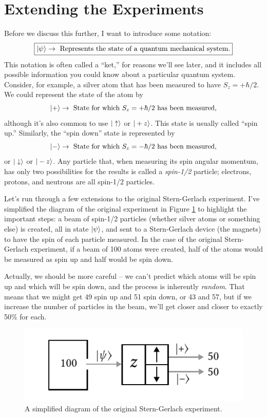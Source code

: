 %
%
%

\section{Extending the Experiments}

Before we discuss this further, I want to introduce some notation:
\begin{equation}
\label{eq_ket_definition}
\boxed{
| \psi \rangle \rightarrow \text{ Represents the state of a quantum mechanical system.}
}
\end{equation}
This notation is often called a ``ket,'' for reasons we'll see later, and it includes all possible information you could know about a particular quantum system.  Consider, for example, a silver atom that has been measured to have $S_z = +\hbar/2$.  We could represent the state of the atom by 
\[
| + \rangle \rightarrow \text{ State for which $S_z = +\hbar/2$ has been measured},
\]
although it's also common to use $| \uparrow \rangle$ or $| +z \rangle$.  This state is usually called ``spin up.''  Similarly, the ``spin down'' state is represented by 
\[
| - \rangle \rightarrow \text{ State for which $S_z = -\hbar/2$ has been measured},
\]
or  $| \downarrow \rangle$ or $| -z \rangle$.  Any particle that, when measuring its spin angular momentum, has only two possibilities for the results is called a \emph{spin-1/2} particle; electrons, protons, and neutrons are all spin-1/2 particles.

Let's run through a few extensions to the original Stern-Gerlach experiment.  I've simplified the diagram of the original experiment in Figure \ref{fig_sg_0} to highlight the important steps: a beam of spin-1/2 particles (whether silver atoms or something else) is created, all in state $| \psi \rangle$, and sent to a Stern-Gerlach device (the magnets) to have the spin of each particle measured. In the case of the original Stern-Gerlach experiment, if a beam of 100 atoms were created, half of the atoms would be measured as spin up and half would be spin down.

Actually, we should be more careful -- we can't predict which atoms will be spin up and which will be spin down, and the process is inherently \emph{random}.  That means that we might get 49 spin up and 51 spin down, or 43 and 57, but if we increase the number of particles in the beam, we'll get closer and closer to exactly 50\% for each.   

\begin{figure}
\centering\includegraphics[width=0.6\linewidth]{Figures/Chapter 1/fig_sg_0.pdf}
\caption{A simplified diagram of the original Stern-Gerlach experiment.}
\label{fig_sg_0}
\end{figure}

